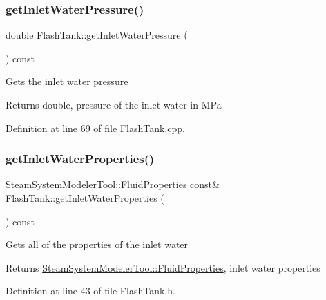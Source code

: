 \mbox{\label{class_flash_tank_a62e8ff97d91da0845526c494022e41da}} 
\subsubsection{\texorpdfstring{get\+Inlet\+Water\+Pressure()}{getInletWaterPressure()}}
{\footnotesize\ttfamily double Flash\+Tank\+::get\+Inlet\+Water\+Pressure (\begin{DoxyParamCaption}{ }\end{DoxyParamCaption}) const}

Gets the inlet water pressure \begin{DoxyReturn}{Returns}
double, pressure of the inlet water in M\+Pa 
\end{DoxyReturn}


Definition at line 69 of file Flash\+Tank.\+cpp.

\mbox{\label{class_flash_tank_a582b3e730f1619891533965940d692de}} 
\subsubsection{\texorpdfstring{get\+Inlet\+Water\+Properties()}{getInletWaterProperties()}}
{\footnotesize\ttfamily \hyperlink{struct_steam_system_modeler_tool_1_1_fluid_properties}{Steam\+System\+Modeler\+Tool\+::\+Fluid\+Properties} const\& Flash\+Tank\+::get\+Inlet\+Water\+Properties (\begin{DoxyParamCaption}{ }\end{DoxyParamCaption}) const\hspace{0.3cm}{\ttfamily [inline]}}

Gets all of the properties of the inlet water \begin{DoxyReturn}{Returns}
\hyperlink{struct_steam_system_modeler_tool_1_1_fluid_properties}{Steam\+System\+Modeler\+Tool\+::\+Fluid\+Properties}, inlet water properties 
\end{DoxyReturn}


Definition at line 43 of file Flash\+Tank.\+h.

